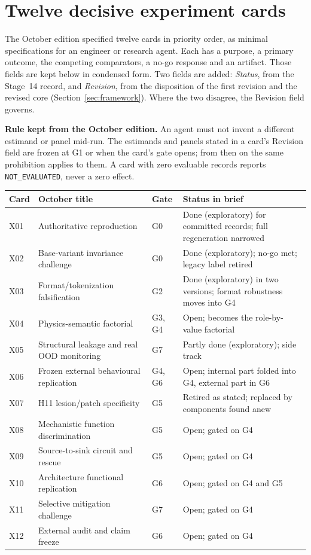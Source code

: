 \documentclass[10pt,a4paper]{article}
\newcommand{\NE}{\texttt{NOT\_EVALUATED}}
\begin{document}
\section{Twelve decisive experiment cards}
\label{sec:cards}

The October edition specified twelve cards in priority order, as minimal specifications for an engineer or
research agent. Each has a purpose, a primary outcome, the competing comparators, a no-go response and an
artifact. Those fields are kept below in condensed form. Two fields are added: \emph{Status}, from the Stage~14
record, and \emph{Revision}, from the disposition of the first revision and the revised core
(Section~\ref{sec:framework}). Where the two disagree, the Revision field governs.

\textbf{Rule kept from the October edition.} An agent must not invent a different estimand or panel mid-run. The
estimands and panels stated in a card's Revision field are frozen at G1 or when the card's gate opens; from then
on the same prohibition applies to them. A card with zero evaluable records reports \NE{}, never a zero effect.

\begin{center}\small
\begin{tabularx}{\linewidth}{@{}P{1.0cm}P{4.3cm}P{1.4cm}L@{}}
\toprule
Card & October title & Gate & Status in brief \\
\midrule
X01 & Authoritative reproduction & G0 & Done (exploratory) for committed records; full regeneration narrowed \\
X02 & Base-variant invariance challenge & G0 & Done (exploratory); no-go met; legacy label retired \\
X03 & Format/tokenization falsification & G2 & Done (exploratory) in two versions; format robustness moves into G4 \\
X04 & Physics-semantic factorial & G3, G4 & Open; becomes the role-by-value factorial \\
X05 & Structural leakage and real OOD monitoring & G7 & Partly done (exploratory); side track \\
X06 & Frozen external behavioural replication & G4, G6 & Open; internal part folded into G4, external part in G6 \\
X07 & H11 lesion/patch specificity & G5 & Retired as stated; replaced by components found anew \\
X08 & Mechanistic function discrimination & G5 & Open; gated on G4 \\
X09 & Source-to-sink circuit and rescue & G5 & Open; gated on G4 \\
X10 & Architecture functional replication & G6 & Open; gated on G4 and G5 \\
X11 & Selective mitigation challenge & G7 & Open; gated on G4 \\
X12 & External audit and claim freeze & G6 & Open; gated on G4 \\
\bottomrule
\end{tabularx}
\end{center}
\end{document}

